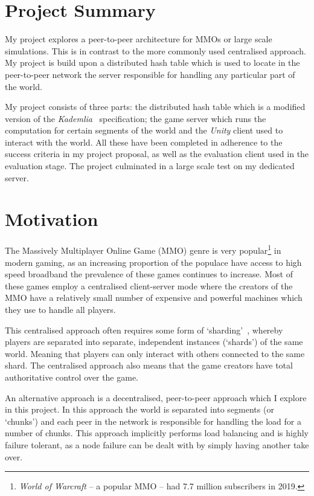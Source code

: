 \documentclass[10pt,twoside,notitlepage,a4paper]{report}
\newcommand{\unity}{\emph{Unity}}
\newcommand{\kademlia}{\emph{Kademlia}}
\begin{document}
	\section{Project Summary}
	My project explores a peer-to-peer architecture for MMOs or large scale simulations. This is in contrast to the more commonly used centralised approach. My project is build upon a distributed hash table which is used to locate in the peer-to-peer network the server responsible for handling any particular part of the world.
	
	My project consists of three parts: the distributed hash table which is a modified version of the \kademlia{}~\cite{kademlia} specification; the game server which runs the computation for certain segments of the world and the \unity{} client used to interact with the world. All these have been completed in adherence to the success criteria in my project proposal, as well as the evaluation client used in the evaluation stage. The project culminated in a large scale test on my dedicated server.
	
	\section{Motivation}
	The Massively Multiplayer Online Game (MMO) genre is very popular\footnote{\emph{World of Warcraft} -- a popular MMO -- had 7.7 million subscribers in 2019.} in modern gaming, as an increasing proportion of the populace have access to high speed broadband the prevalence of these games continues to increase. Most of these games employ a centralised client-server mode where the creators of the MMO have a relatively small number of expensive and powerful machines which they use to handle all players.
	
	This centralised approach often requires some form of `sharding'~\cite{shard}, whereby players are separated into separate, independent instances (`shards') of the same world. Meaning that players can only interact with others connected to the same shard. The centralised approach also means that the game creators have total authoritative control over the game.
	
	An alternative approach is a decentralised, peer-to-peer approach which I explore in this project. In this approach the world is separated into segments (or `chunks') and each peer in the network is responsible for handling the load for a number of chunks. This approach implicitly performs load balancing and is highly failure tolerant, as a node failure can be dealt with by simply having another take over.
	
\end{document}
